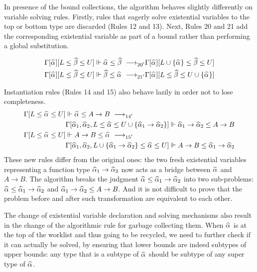 In presence of the bound collections, the algorithm behaves slightly differently
on variable solving rules.
Firstly, rules that eagerly solve existential variables to the top or bottom type
are discarded (Rules 12 and 13).
Next, Rules 20 and 21 add the corresponding existential variable
as part of a bound rather than performing a global substitution.

\begin{gather*}
    \begin{aligned}
\Gm[\al][L \le \bt \le U] \Vdash \al \le \bt &\rrule{20'}
    \Gm[\al][L \cup \{\al\} \le \bt \le U]\\
\Gm[\al][L \le \bt \le U] \Vdash \bt \le \al &\rrule{21'}
    \Gm[\al][L \le \bt \le U \cup \{\al\}]\\
    \end{aligned}
\end{gather*}

Instantiation rules (Rules 14 and 15) also behave lazily in order not to lose completeness.
\begin{gather*}
    \begin{aligned}
\Gm[L \le \al \le U] &\Vdash \al \le A \to B \rrule{14'}\\
    & \Gm[\al[1], \al[2], L \le \al \le U \cup \{\al[1] \to \al[2]\}] \Vdash \al[1] \to \al[2] \le A \to B\\
\Gm[L \le \al \le U] &\Vdash A \to B \le \al \rrule{15'}\\
    & \Gm[\al[1], \al[2], L \cup \{\al[1] \to \al[2]\} \le \al \le U] \Vdash A \to B \le \al[1] \to \al[2]\\
    \end{aligned}
\end{gather*}
These new rules differ from the original ones:
the two fresh existential variables representing a function type $\al[1] \to \al[2]$
now acts as a bridge between $\al$ and $A \to B$.
The algorithm breaks the judgment $\al \le \al[1] \to \al[2]$ into two sub-problems:
$\al \le \al[1] \to \al[2]$ and $\al[1] \to \al[2] \le A \to B$.
And it is not difficult to prove that the problem before and after
such transformation are equivalent to each other.

The change of existential variable declaration and solving mechanisms
also result in the change of
the algorithmic rule for garbage collecting them.
When $\al$ is at the top of the worklist and thus going to be recycled,
we need to further check if it can actually be solved,
by ensuring that lower bounds are indeed subtypes of upper bounds:
any type that is a subtype of $\al$ should be subtype of
any super type of $\al$.

